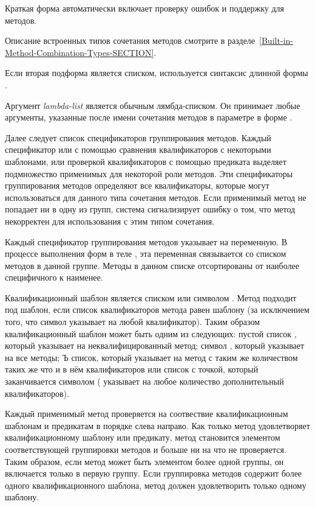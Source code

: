 \begin{defmac}
Краткая форма автоматически включает проверку ошибок и поддержку для
 методов.

Описание встроенных типов сочетания методов смотрите в
разделе~\ref{Built-in-Method-Combination-Types-SECTION}. 

Если вторая подформа является списком, используется синтаксис длинной формы
.

Аргумент \emph{lambda-list} является обычным лямбда-списком. Он принимает любые
аргументы, указанные после имени сочетания методов в параметре
 в форме .

Далее следует список спецификаторов группирования методов. Каждый спецификатор
или с помощью сравнения квалификаторов с некоторыми шаблонами, или проверкой
квалификаторов с помощью предиката выделяет подмножество применимых для
некоторой роли методов. Эти спецификаторы группирования методов определяют все
квалификаторы, которые могут использоваться для данного типа сочетания
методов. Если применимый метод не попадает ни в одну из групп, система
сигнализирует ошибку о том, что метод некорректен для использования с этим типом
сочетания.

Каждый спецификатор группирования методов указывает на переменную. В процессе
выполнения форм в теле , эта переменная
связывается со списком методов в данной группе. Методы в данном списке
отсортированы от наиболее специфичного к наименее.

Квалификационный шаблон является списком или символом \cdf{*}. Метод подходит под
шаблон, если список квалификаторов метода равен  шаблону
 (за исключением того, что символ \cdf{*} указывает на любой
квалификатор). Таким образом квалификационный шаблон может быть одним из
следующих:
пустой список \cd{()}, который указывает на неквалифицированный метод;
символ \cdf{*}, который указывает на все методы;
Ъ список, который указывает на метод с таким же количеством таких же что и в нём
квалификаторов
или список с точкой, который заканчивается символом \cdf{*} (\cdf{*} указывает
на любое количество дополнительный квалификаторов).

Каждый применимый метод проверяется на соотвествие квалификационным шаблонам и
предикатам в порядке слева направо. Как только метод удовлетворяет
квалификационному шаблону или предикату, метод становится элементом
соответствующей группировки методов и больше ни на что не проверяется. Таким
образом, если метод может быть элементом более одной группы, он включается
только в первую группу. Если группировка методов содержит более одного
квалификационного шаблона, метод должен удовлетворить только одному шаблону.


\end{defmac}
